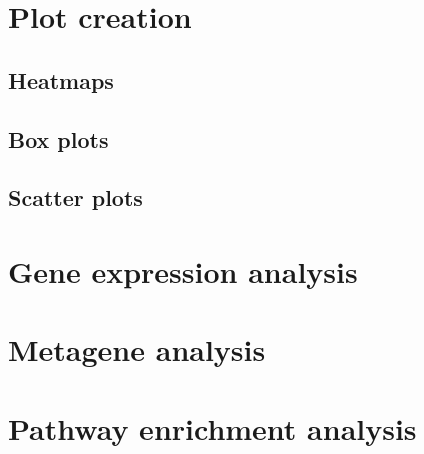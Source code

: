 \section{Plot creation}
\label{sec:plot_creation}

\subsection{Heatmaps}
\label{sub:heatmaps}






\subsection{Box plots}
\label{sub:box_plots}





\subsection{Scatter plots}
\label{sub:scatter_plots}






\section{Gene expression analysis}
\label{sec:gene_expression_analysis}



\section{Metagene analysis}
\label{sec:metagene_analysis}





\section{Pathway enrichment analysis}
\label{sec:pathway_enrichment_analysis}



























